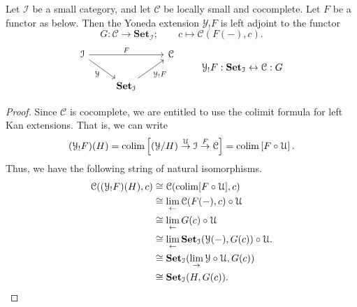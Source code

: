 \documentclass[main.tex]{subfiles}
\begin{document}
\begin{lemma}
  \label{lemma:right_adjoint_to_yoneda_extension}
  Let $\mathcal{I}$ be a small category, and let $\mathcal{C}$ be locally small and cocomplete. Let $F$ be a functor as below. Then the Yoneda extension $\mathcal{Y}_{!}F$ is left adjoint to the functor
  \begin{equation*}
    G\colon \mathcal{C} \to \mathbf{Set}_{\mathcal{I}};\qquad c \mapsto \mathcal{C}(F(-), c).
  \end{equation*}
  \begin{equation*}
    \begin{tikzcd}
      \mathcal{I}
      \arrow[rr, "F"]
      \arrow[dr, swap, "\mathcal{Y}"]
      && \mathcal{C}
      \\
      & {\mathbf{Set}_{\mathcal{I}}}
      \arrow[ur, swap, "\mathcal{Y}_{!}F"]
    \end{tikzcd}
    \qquad
    \begin{tikzcd}
      \mathcal{Y}_{!}F : \mathbf{Set}_{\mathcal{I}} \leftrightarrow \mathcal{C} : G
    \end{tikzcd}
  \end{equation*}
\end{lemma}
\begin{proof}
  Since $\mathcal{C}$ is cocomplete, we are entitled to use the colimit formula for left Kan extensions. That is, we can write
  \begin{equation*}
    (\mathcal{Y}_{!}F)(H) = \operatorname*{colim} \left[ (\mathcal{Y} / H) \overset{\mathcal{U}}{\to} \mathcal{I} \overset{F}{\to} \mathcal{C} \right] = \operatorname*{colim} \left[ F \circ \mathcal{U} \right].
  \end{equation*}
  Thus, we have the following string of natural isomorphisms.
  \begin{align*}
    \mathcal{C}((\mathcal{Y}_{!}F)(H), c) &\cong \mathcal{C}(\operatorname*{colim} [F \circ \mathcal{U}], c) \\
    &\cong \lim_{\leftarrow}\mathcal{C}(F(-), c) \circ \mathcal{U} \\
    &\cong \lim_{\leftarrow} G(c) \circ \mathcal{U} \\
    &\cong \lim_{\leftarrow}\mathbf{Set}_{\mathcal{I}}(\mathcal{Y}(-), G(c)) \circ \mathcal{U}. \\
    &\cong\mathbf{Set}_{\mathcal{I}}(\lim_{\rightarrow}\mathcal{Y} \circ \mathcal{U}, G(c)) \\
    &\cong\mathbf{Set}_{\mathcal{I}}(H, G(c)).
  \end{align*}
\end{proof}
\end{document}
